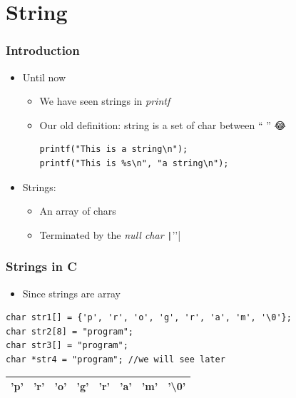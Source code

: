 \documentclass{../c-lecture}
\begin{document}
\section{String}

\begin{frame}[fragile]
  \frametitle{Introduction}
  \begin{itemize}
    \item Until now
    \begin{itemize}
      \item We have seen strings in \textit{\color{Cyan} printf}
      \item Our old definition: string is a set of char between `` '' 😂
      \begin{verbatim}
printf("This is a string\n");
printf("This is %s\n", "a string\n");
      \end{verbatim}
    \end{itemize}
    \item Strings:
    \begin{itemize}
      \item An array of chars
      \item Terminated by the \textit{\color{Orange} null char} \texttt|'\0'|
    \end{itemize}
  \end{itemize}
\end{frame}

\begin{frame}[fragile]
  \frametitle{Strings in C}
  \begin{itemize}
    \item Since strings are array
  \end{itemize}
  \begin{verbatim}
char str1[] = {'p', 'r', 'o', 'g', 'r', 'a', 'm', '\0'};
char str2[8] = "program";
char str3[] = "program";
char *str4 = "program"; //we will see later
  \end{verbatim}
  \begin{table}
  \begin{tabular}{*{8}{c}}
    \toprule
    'p' &
    'r' &
    'o' &
    'g' &
    'r' &
    'a' &
    'm' &
    {\color{Orange} '\textbackslash 0'} \\
    \bottomrule
  \end{tabular}
  \end{table}
\end{frame}
\end{document}

